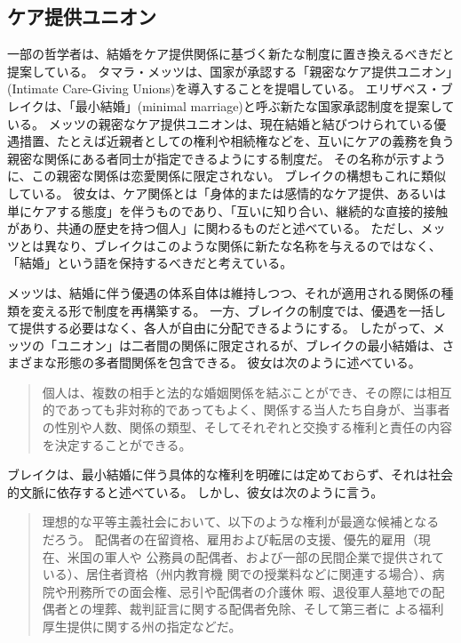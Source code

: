 \documentclass[paper=a4,book,openany]{jlreq}
\begin{document}
\subsection{ケア提供ユニオン}

一部の哲学者は、結婚をケア提供関係に基づく新たな制度に置き換えるべきだと提案している。
タマラ・メッツは、国家が承認する「親密なケア提供ユニオン」(Intimate Care-Giving Unions)を導入することを提唱している。
エリザベス・ブレイクは、「最小結婚」(minimal marriage)と呼ぶ新たな国家承認制度を提案している\citep{metz10:_untyin_knot,brake12:_minim_marriag}。
メッツの親密なケア提供ユニオンは、現在結婚と結びつけられている優遇措置、たとえば近親者としての権利や相続権などを、互いにケアの義務を負う親密な関係にある者同士が指定できるようにする制度だ。
その名称が示すように、この親密な関係は恋愛関係に限定されない。
ブレイクの構想もこれに類似している。
彼女は、ケア関係とは「身体的または感情的なケア提供、あるいは単にケアする態度」を伴うものであり、「互いに知り合い、継続的な直接的接触があり、共通の歴史を持つ個人」に関わるものだと述べている\citep[p.106]{brake12:_minim_marriag}。
ただし、メッツとは異なり、ブレイクはこのような関係に新たな名称を与えるのではなく、「結婚」という語を保持するべきだと考えている。

メッツは、結婚に伴う優遇の体系自体は維持しつつ、それが適用される関係の種類を変える形で制度を再構築する。
一方、ブレイクの制度では、優遇を一括して提供する必要はなく、各人が自由に分配できるようにする。
したがって、メッツの「ユニオン」は二者間の関係に限定されるが、ブレイクの最小結婚は、さまざまな形態の多者間関係を包含できる。
彼女は次のように述べている。

\begin{quote}
個人は、複数の相手と法的な婚姻関係を結ぶことができ、その際には相互的であっても非対称的であってもよく、関係する当人たち自身が、当事者の性別や人数、関係の類型、そしてそれぞれと交換する権利と責任の内容を決定することができる。
\citep[p.157]{brake12:_minim_marriag}
\end{quote}

ブレイクは、最小結婚に伴う具体的な権利を明確には定めておらず、それは社会的文脈に依存すると述べている。
しかし、彼女は次のように言う。

\begin{quote}
理想的な平等主義社会において、以下のような権利が最適な候補となる
だろう。
配偶者の在留資格、雇用および転居の支援、優先的雇用（現在、米国の軍人や
公務員の配偶者、および一部の民間企業で提供されている）、居住者資格（州内教育機
関での授業料などに関連する場合）、病院や刑務所での面会権、忌引や配偶者の介護休
暇、退役軍人墓地での配偶者との埋葬、裁判証言に関する配偶者免除、そして第三者に
よる福利厚生提供に関する州の指定などだ。
\citep[p.157]{brake12:_minim_marriag}
\end{quote}
\end{document}
